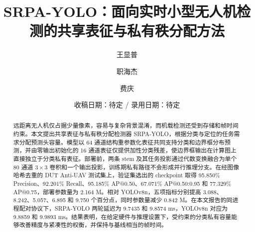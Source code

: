 \documentclass[twocolumn]{svjour3}
\begin{document}
\title{SRPA-YOLO：面向实时小型无人机检测的共享表征与私有秩分配方法}

\author{王显普 \and 职海杰 \and 费庆}


\date{收稿日期：待定 / 录用日期：待定}
\maketitle

\begin{abstract}
远距离无人机仅占据少量像素，容易与复杂背景混淆，而机载检测还受到存储和帧时间约束。本文提出共享表征与私有秩分配检测器 SRPA-YOLO，根据分类与定位的任务需求分配预测头容量。模型以 64 通道结构重参数化表征共同支持分类和边界框分布预测，并由零输出初始化的 16 通道表征仅提供加性分类残差，使边界框输出在计算图上直接独立于分类私有表征。部署前，两条 stem 及其任务投影通过代数变换融合为单个 80 通道 $3\times3$ 卷积和一个输出投影，训练期私有路径不会形成并行推理分支。在经图像哈希去重的 DUT Anti-UAV 测试集上，验证集选出的 checkpoint 取得 95.850\% Precision、92.201\% Recall、95.185\% AP@0.50、67.071\% AP@0.50:0.95 和 77.329\% AP@0.75，部署参数量为 2.164 M。相对 YOLOv8n，五项指标分别提高 3.088、8.242、5.057、6.895 和 9.750 个百分点，同时参数量减少 0.842 M。在本文报告的同进程配对协议下，SRPA-YOLO 两轮延迟为 9.7435 和 9.8574 ms，YOLOv8n 对应为 9.8859 和 9.9893 ms。结果表明，在给定硬件与推理设置下，受约束的分类私有容量能够改善精度与紧凑性的权衡，并保持与基线相当的帧时间。
\end{abstract}










\end{document}
